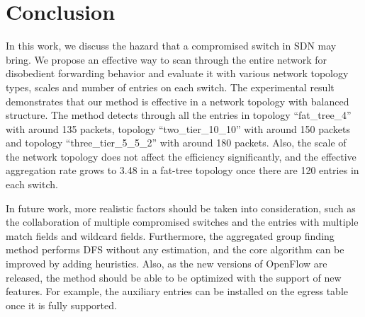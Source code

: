 \documentclass[conference]{IEEEtran}
\begin{document}
\section{Conclusion}
\label{conclusion}
In this work, we discuss the hazard that a compromised switch in SDN may bring. We propose an effective way to scan through the entire network for disobedient forwarding behavior and evaluate it with various network topology types, scales and number of entries on each switch. The experimental result demonstrates that our method is effective in a network topology with balanced structure. The method detects through all the entries in topology ``fat\_tree\_4'' with around 135 packets, topology ``two\_tier\_10\_10'' with around 150 packets and topology ``three\_tier\_5\_5\_2'' with around 180 packets. Also, the scale of the network topology does not affect the efficiency significantly, and the effective aggregation rate grows to 3.48 in a fat-tree topology once there are 120 entries in each switch. 

In future work, more realistic factors should be taken into consideration, such as the collaboration of multiple compromised switches and the entries with multiple match fields and wildcard fields. Furthermore, the aggregated group finding method performs DFS without any estimation, and the core algorithm can be improved by adding heuristics. Also, as the new versions of OpenFlow are released, the method should be able to be optimized with the support of new features. For example, the auxiliary entries can be installed on the egress table once it is fully supported.





\end{document}
